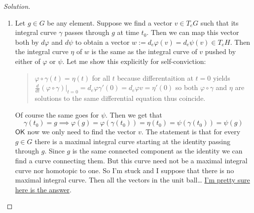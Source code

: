 \begin{proof}[Solution]
\begin{enumerate}[label=\alph*.]
		\item Let $g\in G$ be any element. Suppose we find a vector $v\in T_eG$ such that its integral curve $\gamma$ passes through $g$ at time $t_0$. Then we can map this vector both by $d\varphi$ and $d\psi$ to obtain a vector $w:=d_e\varphi(v)=d_e\psi(v)\in T_eH$. Then the integral curve $\eta$ of  $w$ is the same as the integral curve of $v$ pushed by either of  $\varphi$ or $\psi$. Let me show this explicitly for self-conviction:
			\begin{quotation}
				$\varphi\circ \gamma(t)=\eta(t)$ for all $t$ because differentaition at $t=0$ yields  $\frac{d}{dt}(\varphi\circ \gamma)\Big|_{t=0}=d_e\varphi\gamma'(0)=d_e\varphi v=\eta'(0)$ so both $\varphi\circ \gamma$ and $\eta$ are solutions to the same differential equation thus coincide.
			\end{quotation}
			Of course the same goes for $\psi$. Then we get that
			\[\gamma(t_0)=g\implies \varphi(g)=\varphi(\gamma(t_0))=\eta(t_0)=\psi(\gamma(t_0))=\psi(g)\]
$\mathsf{OK}$ now we only need to find the vector $v$. The statement is that for every $g\in G$ there is a maximal integral curve starting at the identity passing through $g$. Since $g$ is the same connected component as the identity we can find a curve connecting them. But this curve need not be a maximal integral curve nor homotopic to one. So I'm stuck and I suppose that there is no maximal integral curve. Then all the vectors in the unit ball… \href{https://math.stackexchange.com/questions/1258904/how-to-show-that-for-every-element-g-in-a-lie-group-the-curve-gammat-g}{I'm pretty sure here is the answer}.

	\end{enumerate}
\end{proof}

